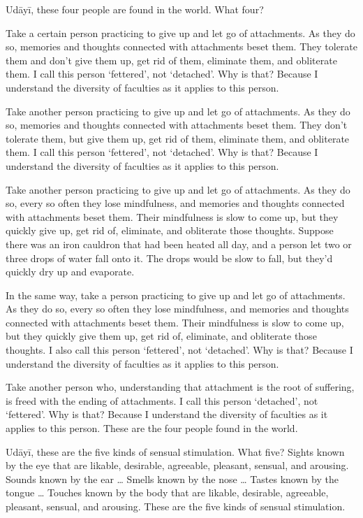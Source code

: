 \documentclass[12pt,openany]{book}%
\begin{document}
\textsanskrit{Udāyī}, these four people are found in the world. What four? 

Take a certain person practicing to give up and let go of attachments. As they do so, memories and thoughts connected with attachments beset them. They tolerate them and don’t give them up, get rid of them, eliminate them, and obliterate them. I call this person ‘fettered’, not ‘detached’. Why is that? Because I understand the diversity of faculties as it applies to this person. 

Take another person practicing to give up and let go of attachments. As they do so, memories and thoughts connected with attachments beset them. They don’t tolerate them, but give them up, get rid of them, eliminate them, and obliterate them. I call this person ‘fettered’, not ‘detached’. Why is that? Because I understand the diversity of faculties as it applies to this person. 

Take another person practicing to give up and let go of attachments. As they do so, every so often they lose mindfulness, and memories and thoughts connected with attachments beset them. Their mindfulness is slow to come up, but they quickly give up, get rid of, eliminate, and obliterate those thoughts. Suppose there was an iron cauldron that had been heated all day, and a person let two or three drops of water fall onto it. The drops would be slow to fall, but they’d quickly dry up and evaporate. 

In the same way, take a person practicing to give up and let go of attachments. As they do so, every so often they lose mindfulness, and memories and thoughts connected with attachments beset them. Their mindfulness is slow to come up, but they quickly give them up, get rid of, eliminate, and obliterate those thoughts. I also call this person ‘fettered’, not ‘detached’. Why is that? Because I understand the diversity of faculties as it applies to this person. 

Take another person who, understanding that attachment is the root of suffering, is freed with the ending of attachments. I call this person ‘detached’, not ‘fettered’. Why is that? Because I understand the diversity of faculties as it applies to this person. These are the four people found in the world. 

\textsanskrit{Udāyī}, these are the five kinds of sensual stimulation. What five? Sights known by the eye that are likable, desirable, agreeable, pleasant, sensual, and arousing. Sounds known by the ear … Smells known by the nose … Tastes known by the tongue … Touches known by the body that are likable, desirable, agreeable, pleasant, sensual, and arousing. These are the five kinds of sensual stimulation. 
\end{document}
